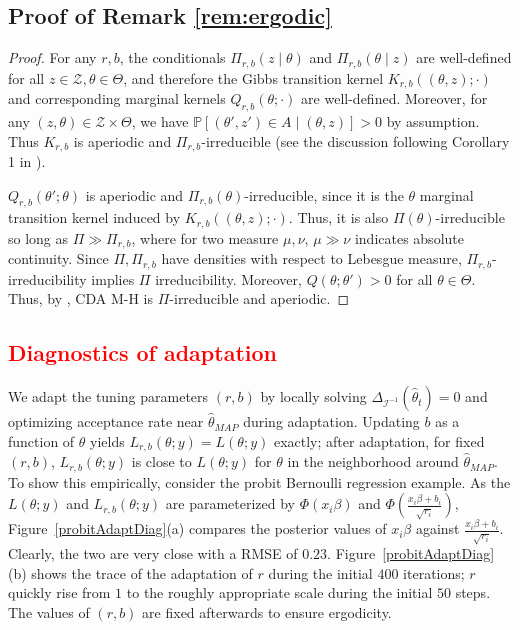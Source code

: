 \documentclass[11pt]{article}
\newcommand{\leo}[1]{{\textcolor{red}{#1}}}
\newcommand{\bb}[1]{\mathbb{#1}}
\newcommand{\mc}[1]{\mathcal{#1}}
\begin{document}
\subsection{Proof of Remark \ref{rem:ergodic}}
\begin{proof}
For any $r,b$, the conditionals $\Pi_{r,b}(z \mid \theta)$ and $\Pi_{r,b}(\theta \mid z)$ are well-defined for all $z \in \mc Z, \theta \in \Theta$, and therefore the Gibbs transition kernel $K_{r,b}((\theta,z);\cdot)$ and corresponding marginal kernels $Q_{r,b}(\theta;\cdot)$ are well-defined. Moreover, for any $(z,\theta) \in \mc Z \times \Theta$, we have $\bb P[(\theta',z') \in A \mid (\theta,z)] > 0$ by assumption. Thus $K_{r,b}$ is aperiodic and $\Pi_{r,b}$-irreducible (see the discussion following Corollary 1 in \cite{roberts1994simple}).

$Q_{r,b}(\theta';\theta)$ is aperiodic and $\Pi_{r,b}(\theta)$-irreducible, since it is the $\theta$ marginal transition kernel induced by $K_{r,b}((\theta,z);\cdot)$. Thus, it is also $\Pi(\theta)$-irreducible so long as $\Pi \gg \Pi_{r,b}$, where for two measure $\mu,\nu$, $\mu \gg \nu$ indicates absolute continuity. Since $\Pi, \Pi_{r,b}$ have densities with respect to Lebesgue measure, $\Pi_{r,b}$-irreducibility implies $\Pi$ irreducibility. Moreover, $Q(\theta;\theta') > 0$ for all $\theta \in \Theta$. Thus, by \cite[Theorem 3]{roberts1994simple}, CDA M-H is $\Pi$-irreducible and aperiodic. 
\end{proof}

\leo{
\subsection{Diagnostics of adaptation}
}
We adapt the tuning parameters $(r,b)$ by locally solving
 $\Delta_{\mc I^{-1}}(\hat{\theta}_{t})=0$ and
 optimizing acceptance rate near 
 $\hat\theta_{MAP}$ during adaptation. Updating $b$  as a function
 of $\theta$ yields $L_{r,b}(\theta;y)=L(\theta;y)$ exactly;  after adaptation,
for  fixed
 $(r,b)$, $L_{r,b}(\theta;y)$ is close to $L(\theta;y)$ for $\theta$ in the neighborhood
 around $\hat\theta_{MAP}$. To show this empirically, consider the
 probit Bernoulli regression example. As the $L(\theta;y)$ and $L_{r,b}(\theta;y)$
 are parameterized by $\Phi(x_i\beta)$ and $\Phi(\frac{x_i\beta+b_i}{\sqrt{r_i}})$, Figure~\ref{probitAdaptDiag}(a) compares the posterior values of $x_i\beta$ against
$\frac{x_i\beta+b_i}{\sqrt{r_i}}$. Clearly, the two are very close with a
RMSE of $0.23$.
Figure~\ref{probitAdaptDiag}(b) shows the trace of the adaptation of $r$
during
the initial $400$ iterations;
$r$ quickly rise from $1$ to the roughly  appropriate scale during the
initial $50$ steps. The values of $(r,b)$ are fixed afterwards to ensure
ergodicity.
\end{document}
